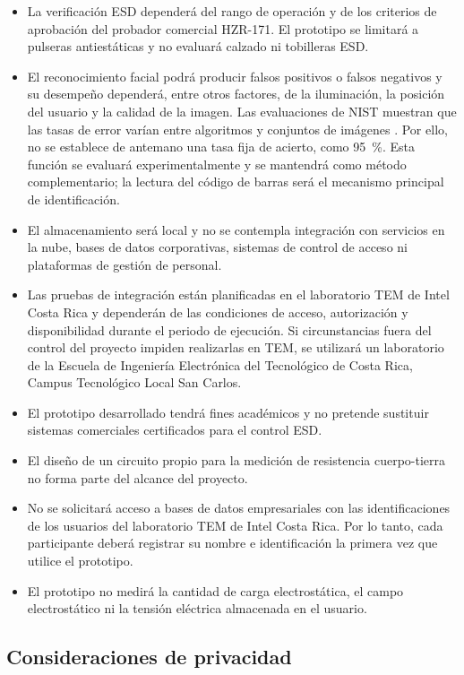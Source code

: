\begin{itemize}
\item La verificación ESD dependerá del rango de operación y de los criterios de
aprobación del probador comercial HZR-171. El prototipo se limitará a pulseras
antiestáticas y no evaluará calzado ni tobilleras ESD.
\item El reconocimiento facial podrá producir falsos positivos o falsos
negativos y su desempeño dependerá, entre otros factores, de la iluminación, la
posición del usuario y la calidad de la imagen. Las evaluaciones de NIST
muestran que las tasas de error varían entre algoritmos y conjuntos de imágenes
\cite{NISTFRTE11}. Por ello, no se establece de antemano una tasa fija de
acierto, como 95~\%. Esta función se evaluará experimentalmente y se mantendrá
como método complementario; la lectura del código de barras será el mecanismo
principal de identificación.
\item El almacenamiento será local y no se contempla integración con servicios
en la nube, bases de datos corporativas, sistemas de control de acceso ni
plataformas de gestión de personal.
\item Las pruebas de integración están planificadas en el laboratorio TEM de
Intel Costa Rica y dependerán de las condiciones de acceso, autorización y
disponibilidad durante el periodo de ejecución. Si circunstancias fuera del
control del proyecto impiden realizarlas en TEM, se utilizará un laboratorio de
la Escuela de Ingeniería Electrónica del Tecnológico de Costa Rica, Campus
Tecnológico Local San Carlos.
\item El prototipo desarrollado tendrá fines académicos y 
no pretende sustituir sistemas comerciales certificados para el control ESD.
\item El diseño de un circuito propio para la medición de resistencia
cuerpo-tierra no forma parte del alcance del proyecto.
\item No se solicitará acceso a bases de datos empresariales con las
identificaciones de los usuarios del laboratorio TEM de Intel Costa Rica. Por
lo tanto, cada participante deberá registrar su nombre e identificación la
primera vez que utilice el prototipo.
\item El prototipo no medirá la cantidad de carga electrostática, el campo
electrostático ni la tensión eléctrica almacenada en el usuario.
\end{itemize}

\subsection{Consideraciones de privacidad}

